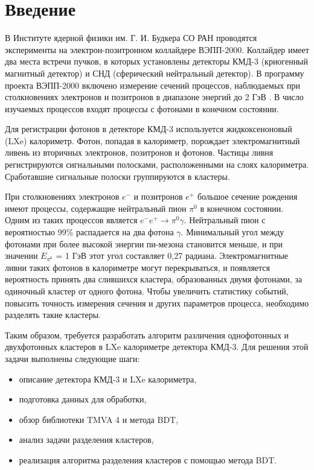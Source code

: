 \documentclass[14pt]{extarticle}
\begin{document}
	\setlength{\abovedisplayskip}{6pt}
	\setlength{\belowdisplayskip}{6pt}
	\setlength{\belowcaptionskip}{-15pt}
	\setcounter{page}{3}
	\thispagestyle{fancy}
\tableofcontents
\newpage
\section{Введение}
В Институте ядерной физики им. Г. И. Будкера СО РАН проводятся эксперименты на электрон-позитронном коллайдере ВЭПП-2000. Коллайдер имеет два места встречи пучков, в которых установлены детекторы КМД-3 (криогенный магнитный детектор) и СНД (сферический нейтральный детектор). В программу проекта ВЭПП-2000 включено измерение сечений процессов, наблюдаемых при столкновениях электронов и позитронов в диапазоне энергий до 2 ГэВ \cite{shatunov}. В число изучаемых процессов входят процессы с фотонами в конечном состоянии.

Для регистрации фотонов в детекторе КМД-3 используется жидкоксеноновый (LXe) калориметр. Фотон, попадая в калориметр, порождает электромагнитный ливень из вторичных электронов, позитронов и фотонов. Частицы ливня регистрируются сигнальными полосками, расположенными на слоях калориметра. Сработавшие сигнальные полоски группируются в кластеры.

При столкновениях электронов $e^-$ и позитронов $e^+$ большое сечение рождения имеют процессы, содержащие нейтральный пион $\pi^0$ в конечном состоянии. Одним из таких процессов является $e^- e^+ \rightarrow \pi^0 \gamma$. Нейтральный пион с вероятностью 99\% распадается на два фотона $\gamma$. Минимальный угол между фотонами при более высокой энергии пи-мезона становится меньше, и при значении $E_{\pi^0}$ = 1 ГэВ этот угол составляет 0,27 радиана. Электромагнитные ливни таких фотонов в калориметре могут перекрываться, и появляется вероятность принять два слившихся кластера, образованных двумя фотонами, за одиночный кластер от одного фотона. Чтобы увеличить статистику событий, повысить точность измерения сечения и других параметров процесса, необходимо разделять такие кластеры.

Таким образом, требуется разработать алгоритм различения однофотонных и двухфотонных кластеров в LXe калориметре детектора КМД-3. Для решения этой задачи выполнены следующие шаги:
\begin{itemize}
	\item описание детектора КМД-3 и LXe калориметра,
	\item подготовка данных для обработки,
	\item обзор библиотеки TMVA 4 и метода BDT,
	\item анализ задачи разделения кластеров,
	\item реализация алгоритма разделения кластеров с помощью метода BDT.
\end{itemize}
\end{document}
